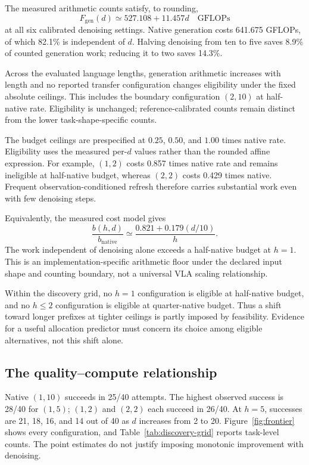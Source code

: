 \documentclass{article}
\begin{document}
The measured arithmetic counts satisfy, to rounding,
\[
 F_{\mathrm{gen}}(d)\simeq 527.108+11.457d\quad\text{GFLOPs}
\]
at all six calibrated denoising settings. Native generation costs 641.675 GFLOPs,
of which 82.1\% is independent of $d$. Halving denoising from ten to five saves
8.9\% of counted generation work; reducing it to two saves 14.3\%.

Across the evaluated language lengths, generation arithmetic increases with
length and no reported transfer configuration changes eligibility under the
fixed absolute ceilings. This includes the boundary configuration $(2,10)$ at
half-native rate. Eligibility is unchanged; reference-calibrated counts remain
distinct from the lower task-shape-specific counts.

The budget ceilings are prespecified at $0.25$, $0.50$, and $1.00$ times native
rate. Eligibility uses the measured per-$d$ values rather than the rounded
affine expression. For example, $(1,2)$ costs 0.857 times native rate and remains
ineligible at half-native budget, whereas $(2,2)$ costs 0.429 times native.
Frequent observation-conditioned refresh therefore carries substantial work
even with few denoising steps.

Equivalently, the measured cost model gives
\[
 \frac{b(h,d)}{b_{\mathrm{native}}}
 \simeq \frac{0.821+0.179(d/10)}{h}.
\]
The work independent of denoising alone exceeds a half-native budget at $h=1$.
This is an implementation-specific arithmetic floor under the declared input
shape and counting boundary, not a universal VLA scaling relationship.

Within the discovery grid, no $h=1$ configuration is eligible at half-native
budget, and no $h\leq2$ configuration is eligible at quarter-native budget.
Thus a shift toward longer prefixes at tighter ceilings is partly imposed by
feasibility. Evidence for a useful allocation predictor must concern its choice
among eligible alternatives, not this shift alone.

\subsection{The quality--compute relationship}

Native $(1,10)$ succeeds in 25/40 attempts. The highest observed success is 28/40
for $(1,5)$; $(1,2)$ and $(2,2)$ each succeed in 26/40. At $h=5$, successes are
21, 18, 16, and 14 out of 40 as $d$ increases from 2 to 20.
Figure~\ref{fig:frontier} shows every configuration, and
Table~\ref{tab:discovery-grid} reports task-level counts. The point estimates
do not justify imposing monotonic improvement with denoising.
\end{document}
